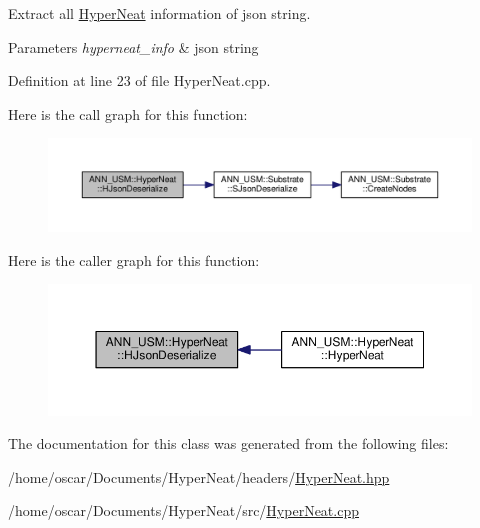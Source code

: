 Extract all \hyperlink{class_a_n_n___u_s_m_1_1_hyper_neat}{Hyper\-Neat} information of json string. 


\begin{DoxyParams}{Parameters}
{\em hyperneat\-\_\-info} & json string \\
\hline
\end{DoxyParams}


Definition at line 23 of file Hyper\-Neat.\-cpp.



Here is the call graph for this function\-:\nopagebreak
\begin{figure}[H]
\begin{center}
\leavevmode
\includegraphics[width=350pt]{class_a_n_n___u_s_m_1_1_hyper_neat_a67803bb6c5dc5986d9c44877d92587af_cgraph}
\end{center}
\end{figure}




Here is the caller graph for this function\-:\nopagebreak
\begin{figure}[H]
\begin{center}
\leavevmode
\includegraphics[width=350pt]{class_a_n_n___u_s_m_1_1_hyper_neat_a67803bb6c5dc5986d9c44877d92587af_icgraph}
\end{center}
\end{figure}




The documentation for this class was generated from the following files\-:\begin{DoxyCompactItemize}
\item 
/home/oscar/\-Documents/\-Hyper\-Neat/headers/\hyperlink{_hyper_neat_8hpp}{Hyper\-Neat.\-hpp}\item 
/home/oscar/\-Documents/\-Hyper\-Neat/src/\hyperlink{_hyper_neat_8cpp}{Hyper\-Neat.\-cpp}\end{DoxyCompactItemize}
